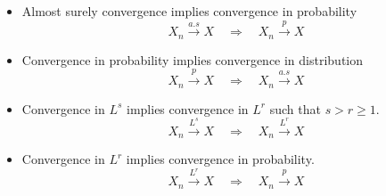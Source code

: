 \begin{itemize}
    \item Almost surely convergence implies convergence in probability
        \[ X_n \stackrel{a.s}{\longrightarrow} X\quad \Rightarrow \quad X_n \stackrel{p}{\longrightarrow} X\]
    \item Convergence in probability implies convergence in distribution
        \[ X_n \stackrel{p}{\longrightarrow} X \quad \Rightarrow  \quad X_n  \stackrel{a.s}{\longrightarrow} X\]
    \item Convergence in $L^s$ implies convergence in $L^r$ such that $s > r \ge 1$.
        \[ X_n \stackrel{L^s}{\longrightarrow} X \quad \Rightarrow \quad X_n \stackrel{L^r}{\longrightarrow} X\]
    \item Convergence in $L^r$ implies convergence in probability.
        \[ X_n \stackrel{L^r}{\longrightarrow} X \quad \Rightarrow \quad  X_n \stackrel{p}{\longrightarrow} X\]
\end{itemize}
